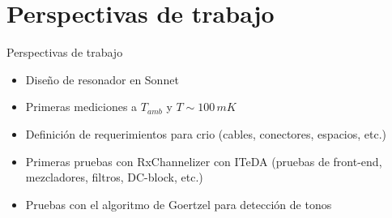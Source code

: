 \documentclass[ignorenonframetext,12pt]{beamer}
\begin{document}
\section{Perspectivas de trabajo}
\begin{frame}{Perspectivas de trabajo}
				\begin{itemize}
								\item Dise\~no de resonador en Sonnet
								\item Primeras mediciones a $T_{amb}$ y $T \sim 100\,mK$
								\item Definici\'on de requerimientos para crio (cables,
												conectores, espacios, etc.)
								\item Primeras pruebas con RxChannelizer con ITeDA (pruebas de
												front-end, mezcladores, filtros, DC-block, etc.)
								\item Pruebas con el algoritmo de Goertzel para detección de
												tonos
				\end{itemize}
\end{frame}
%
%
\end{document}
